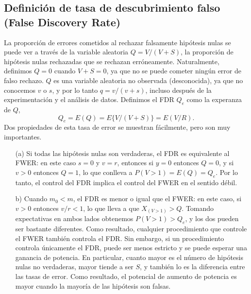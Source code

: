 \documentclass[11pt,letterpaper]{article}
\begin{document}
\subsection{Definición de tasa de descubrimiento falso (False Discovery Rate)} 
La proporción de errores cometidos al rechazar falsamente hipótesis nulas se puede ver a través de la variable aleatoria $Q=V/(V + S)$, la proporción de hipótesis nulas rechazadas que se rechazan erróneamente. Naturalmente, definimos $Q = 0$ cuando $V + S = 0$, ya que no se puede cometer ningún error de falso rechazo. $Q$ es una variable aleatoria no observada (desconocida), ya que no conocemos $v$ o $s$, y por lo tanto $q = v / (v + s)$, incluso después de la experimentación y el análisis de datos. Definimos el FDR $Q_e$ como la experanza de $Q$,
$$Q_e = E (Q) = E\{V / (V + S)\} = E (V / R).$$
Dos propiedades de esta tasa de error se muestran fácilmente, pero son muy importantes.
\begin{itemize}
\item[(a)] Si todas las hipótesis nulas son verdaderas, el FDR es equivalente al FWER: en este caso $s = 0$ y $v = r$, entonces si $y = 0$ entonces $Q = 0$, y si $v> 0$ entonces $Q = 1$, lo que conlleva a $P (V> 1) = E (Q) = Q_e$. Por lo tanto, el control del FDR implica el control del FWER en el sentido débil.
\item[b)] Cuando $m_0<m$, el FDR es menor o igual que el FWER: en este caso, si $v>0$ entonces $v/r<1$, lo que lleva a que $X_{(V>1)}>Q$. Tomando expectativas en ambos lados obtenemos $P(V> 1)> Q_e$, y los dos pueden ser bastante diferentes. Como resultado, cualquier procedimiento que controle el FWER también controla el FDR. Sin embargo, si un procedimiento controla únicamente el FDR, puede ser menos estricto y se puede esperar una ganancia de potencia. En particular, cuanto mayor es el número de hipótesis nulas no verdaderas, mayor tiende a ser $S$, y también lo es la diferencia entre las tasas de error. Como resultado, el potencial de aumento de potencia es mayor cuando la mayoría de las hipótesis son falsas.
\end{itemize}
\end{document}
